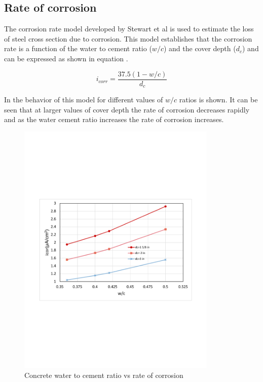 \subsection{Rate of corrosion}

The corrosion rate model developed by Stewart et al \cite{Vu2000}\cite{Stewart1998} is used to estimate the loss of steel cross section due to corrosion.   This model establishes that the corrosion rate is a function of the water to cement ratio ($w/c$) and the cover depth ($d_c$) and can be expressed as shown in equation .


\begin{equation}
  i_{corr}=\frac{37.5(1-w/c)}{d_c}
  \label{eq.CorrosionRate}
\end{equation} 

In  the behavior of this model for different values of $w/c$ ratios is shown. It can be seen that at larger values of cover depth the rate of corrosion decreases rapidly and as the water cement ratio increases the rate of corrosion increases.
%
\begin{figure}[htbp]
\centering
\includegraphics[width=0.85\textwidth]{Chapter-2/figs/wc_icor}
\caption{Concrete water to cement ratio vs rate of corrosion}
\label{fig:hist1}
\end{figure}

